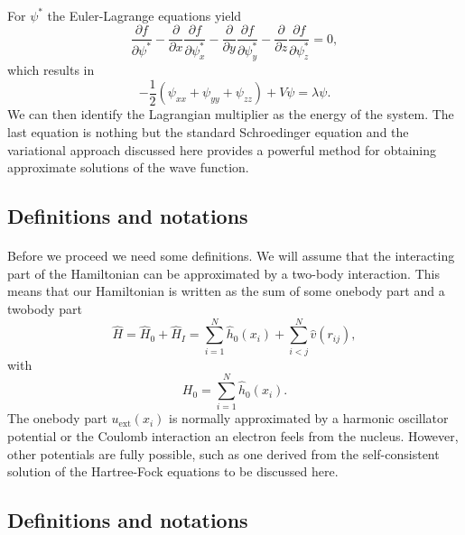 \documentclass[%
twoside,                 %
final,                   %
10pt]{article}
\begin{document}
\paragraph{}
For $\psi^*$ the Euler-Lagrange  equations yield
\[
\frac{\partial f}{\partial \psi^*}- \frac{\partial }{\partial x}\frac{\partial f}{\partial \psi^*_x}-\frac{\partial }{\partial y}\frac{\partial f}{\partial \psi^*_y}-\frac{\partial }{\partial z}\frac{\partial f}{\partial \psi^*_z}=0,
\] 
which results in 
\[
    -\frac{1}{2}(\psi_{xx}+\psi_{yy}+\psi_{zz})+V\psi=\lambda \psi.
\]
We can then identify the  Lagrangian multiplier as the energy of the system. The last equation is 
nothing but the standard 
Schroedinger equation and the variational  approach discussed here provides 
a powerful method for obtaining approximate solutions of the wave function.






\subsection{Definitions and notations}

\paragraph{}
Before we proceed we need some definitions.
We will assume that the interacting part of the Hamiltonian
can be approximated by a two-body interaction.
This means that our Hamiltonian is written as the sum of some onebody part and a twobody part
\begin{equation}
    \hat{H} = \hat{H}_0 + \hat{H}_I 
    = \sum_{i=1}^N \hat{h}_0(x_i) + \sum_{i < j}^N \hat{v}(r_{ij}),
\label{Hnuclei}
\end{equation}
with 
\begin{equation}
  H_0=\sum_{i=1}^N \hat{h}_0(x_i).
\label{hinuclei}
\end{equation}
The onebody part $u_{\mathrm{ext}}(x_i)$ is normally approximated by a harmonic oscillator potential or the Coulomb interaction an electron feels from the nucleus. However, other potentials are fully possible, such as 
one derived from the self-consistent solution of the Hartree-Fock equations to be discussed here.




\subsection{Definitions and notations}
\end{document}
